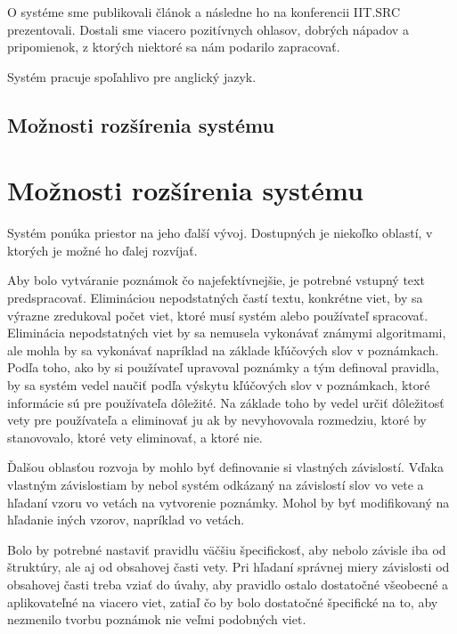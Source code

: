 O systéme sme publikovali článok a následne ho na konferencii IIT.SRC prezentovali. Dostali sme viacero pozitívnych ohlasov, dobrých nápadov a pripomienok, z ktorých niektoré sa nám podarilo zapracovať.

Systém pracuje spoľahlivo pre anglický jazyk.

%
%
{
	\subsection{Možnosti rozšírenia systému}
}
{
	\section{Možnosti rozšírenia systému}
}
\label{subsection:system_continue}
Systém ponúka priestor na jeho ďalší vývoj. Dostupných je niekoľko oblastí, v ktorých je možné ho ďalej rozvíjať.

Aby bolo vytváranie poznámok čo najefektívnejšie, je potrebné vstupný text predspracovať. Elimináciou nepodstatných častí textu, konkrétne viet, by sa výrazne zredukoval počet viet, ktoré musí systém alebo používateľ spracovať. Eliminácia nepodstatných viet by sa nemusela vykonávať známymi algoritmami, ale mohla by sa vykonávať napríklad na základe kľúčových slov v poznámkach. Podľa toho, ako by si používateľ upravoval poznámky a tým definoval pravidla, by sa systém vedel naučiť podľa výskytu kľúčových slov v poznámkach, ktoré informácie sú pre používateľa dôležité. Na základe toho by vedel určiť dôležitosť vety pre používateľa a eliminovať ju ak by nevyhovovala rozmedziu, ktoré by stanovovalo, ktoré vety eliminovať, a ktoré nie.

Ďalšou oblasťou rozvoja by mohlo byť definovanie si vlastných závislostí. Vďaka vlastným závislostiam by nebol systém odkázaný na závislostí slov vo vete a hľadaní vzoru vo vetách na vytvorenie poznámky. Mohol by byť modifikovaný na hľadanie iných vzorov, napríklad vo vetách.

Bolo by potrebné nastaviť pravidlu väčšiu špecifickosť, aby nebolo závisle iba od štruktúry, ale aj od obsahovej časti vety. Pri hľadaní správnej miery závislosti od obsahovej časti treba vziať do úvahy, aby pravidlo ostalo dostatočné všeobecné a aplikovateľné na viacero viet, zatiaľ čo by bolo dostatočné špecifické na to, aby nezmenilo tvorbu poznámok nie veľmi podobných viet.